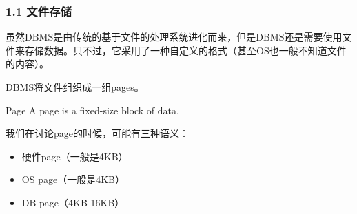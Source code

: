 \documentclass[aspectratio=169, 14pt]{beamer}
\begin{document}
\begin{frame}
	\frametitle{1.1 文件存储}
	虽然DBMS是由传统的\alert{基于文件的处理系统}进化而来，但是DBMS还是需要使用文件来存储数据。只不过，它采用了一种自定义的格式（甚至OS也一般不知道文件的内容）。

	DBMS将文件组织成一组\alert{pages}。

	\begin{exampleblock}{Page}
		A page is a fixed-size block of data.
	\end{exampleblock}

\end{frame}

\begin{frame}[fragile]
	我们在讨论\alert{page}的时候，可能有三种语义：

	\begin{itemize}
		\item 硬件page（一般是4KB）
		\item OS page（一般是4KB）
		\item DB page（4KB-16KB）
	\end{itemize}


\end{frame}
\end{document}
